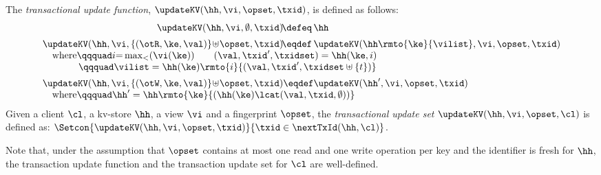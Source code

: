 \begin{definition}
\label{eq:updatekv}
\label{def:updatekv}
The \emph{transactional update function},  $\updateKV(\hh, \vi, \opset, \txid)$,  is
defined as follows:
\[
\begin{array}{@{} l @{}}
	\begin{array}{@{} r @{} l @{}}
		\updateKV(\hh, \vi, \emptyset, \txid) \!\defeq\,  & \hh \vspace{5pt}\\
	    \updateKV(\hh, \vi, \{(\otR, \ke, \val)\} \!\uplus\! \opset, \txid) 
	    \!\eqdef\, & 
	    \updateKV(\hh\rmto{\ke}{\vilist},\vi, \opset, \txid)
	\end{array}\\
%	
	\quad\text{where} 
	\qqquad 
	i {=} \max_{<}(\vi(\ke)) \qquad (\val, \txid', \txidset) = \hh(\ke, i) \\
	\quad\phantom{where} 
	\qqquad 
	\vilist = \hh(\ke)\rmto{i}{(\val, \txid', \txidset \uplus \{ t \})} \vspace{5pt}\\
%	
	\updateKV(\hh, \vi, \{(\otW, \ke, \val)\} \!\uplus\! \opset, \txid) 
    	\eqdef
    \updateKV(\hh', \vi, \opset, \txid) \\
%
 	\quad\text{where} 
	\qqquad 
	\hh' = \hh\rmto{\ke}{ ( \hh(\ke) \lcat (\val, \txid, \emptyset) ) }   
\end{array}
\]
%
Given a client $\cl$, a kv-store $\hh$, a view $\vi$ and a fingerprint $\opset$, 
the \emph{transactional update set} $\updateKV(\hh, \vi, \opset, \cl)$ is defined as:  
$\Setcon{\updateKV(\hh, \vi, \opset, \txid)}{\txid \in \nextTxId(\hh, \cl)}$.
\end{definition}





Note that,  under the assumption that $\opset$ contains at most one read and one write 
operation per key and the identifier is fresh for $\hh$, 
the transaction update function and the transaction update set for
$\cl$ are well-defined. 




